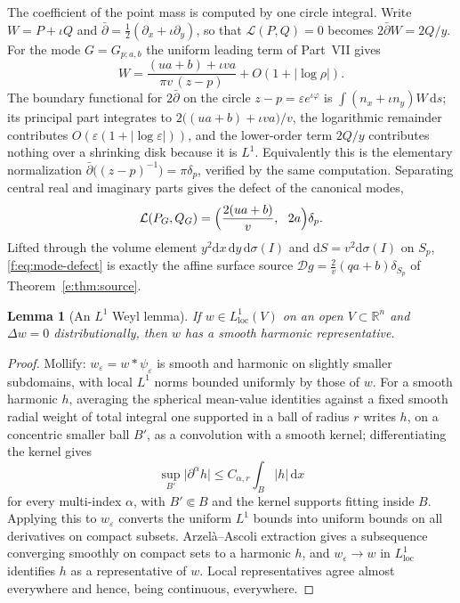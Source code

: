 \documentclass[11pt,a4paper]{article}
\numberwithin{equation}{section}
\newtheorem{lemma}[theorem]{Lemma}
\theoremstyle{definition}
\theoremstyle{remark}
\theoremstyle{plain}
\newcommand{\RR}{\mathbb R}
\newcommand{\Dop}{\mathcal D}
\newcommand{\Sp}{S_{p}}
\newcommand{\abs}[1]{\lvert #1\rvert}
\newcommand{\dd}{\mathrm d}
\begin{document}
The coefficient of the point mass is computed by one circle integral. Write
$W=P+\iota Q$ and $\bar\partial=\tfrac12(\partial_x+\iota\partial_y)$, so
that $\mathcal L(P,Q)=0$ becomes $2\bar\partial W=2Q/y$. For the mode
$G=G_{p;a,b}$ the uniform leading term of Part~VII gives
\[
 W=\frac{(ua+b)+\iota va}{\pi v\,(z-p)}+O(1+\abs{\log\rho}).
\]
The boundary functional for $2\bar\partial$ on the circle
$z-p=\varepsilon e^{\iota\varphi}$ is $\int(n_x+\iota n_y)W\,\dd s$; its
principal part integrates to $2\bigl((ua+b)+\iota va\bigr)/v$, the
logarithmic remainder contributes
$O(\varepsilon(1+\abs{\log\varepsilon}))$, and the lower-order term $2Q/y$
contributes nothing over a shrinking disk because it is $L^1$. Equivalently
this is the elementary normalization
$\bar\partial\bigl((z-p)^{-1}\bigr)=\pi\delta_p$, verified by the same
computation. Separating central real and imaginary parts gives the defect
of the canonical modes,
\begin{equation}
 \mathcal L(P_G,Q_G)
 =\Bigl(\frac{2(ua+b)}{v},\ \ 2a\Bigr)\delta_p .
 \label{f:eq:mode-defect}
\end{equation}
Lifted through the volume element $y^2\dd x\,\dd y\,\dd\sigma(I)$ and
$\dd S=v^2\dd\sigma(I)$ on $\Sp$, \eqref{f:eq:mode-defect} is exactly the
affine surface source $\Dop g=\frac2v(qa+b)\delta_{\Sp}$ of
Theorem~\ref{e:thm:source}.

\begin{lemma}[An $L^1$ Weyl lemma]
\label{f:lem:weyl}
If $w\in L^1_{\mathrm{loc}}(V)$ on an open $V\subset\RR^n$ and
$\Delta w=0$ distributionally, then $w$ has a smooth harmonic
representative.
\end{lemma}
\begin{proof}
Mollify: $w_\varepsilon=w*\psi_\varepsilon$ is smooth and harmonic on
slightly smaller subdomains, with local $L^1$ norms bounded uniformly by
those of $w$. For a smooth harmonic $h$, averaging the spherical mean-value
identities against a fixed smooth radial weight of total integral one
supported in a ball of radius $r$ writes $h$, on a concentric smaller ball
$B'$, as a convolution with a smooth kernel; differentiating the kernel
gives
\[
 \sup_{B'}\abs{\partial^\alpha h}\le C_{\alpha,r}\int_B\abs h\,\dd x
\]
for every multi-index $\alpha$, with $B'\Subset B$ and the kernel supports
fitting inside $B$. Applying this to $w_\varepsilon$ converts the uniform
$L^1$ bounds into uniform bounds on all derivatives on compact subsets.
Arzel\`a--Ascoli extraction gives a subsequence converging smoothly on
compact sets to a harmonic $h$, and $w_\varepsilon\to w$ in
$L^1_{\mathrm{loc}}$ identifies $h$ as a representative of $w$. Local
representatives agree almost everywhere and hence, being continuous,
everywhere.
\end{proof}
\end{document}
